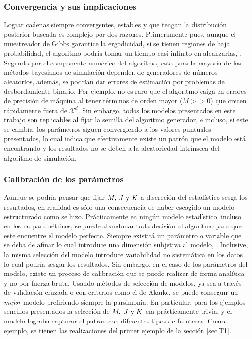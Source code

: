 \documentclass[../Main/Main.tex]{subfiles}
\begin{document}
\subsubsection*{Convergencia y sus implicaciones}
Lograr cadenas siempre convergentes, estables y que tengan la distribución posterior buscada es complejo por dos razones. Primeramente pues, aunque el muestreador de Gibbs garantice la ergodicidad, si se tienen regiones de baja probabilidad, el algoritmo podría tomar un tiempo casi infinito en alcanzarlas, \citet{robert2004monte}. Segundo por el componente numérico del algoritmo, esto pues la mayoría de los métodos bayesianos de simulación dependen de generadores de números aleatorios, además, se podrían dar errores de estimación por problemas de desbordamiento binario. Por ejemplo, no es raro que el algoritmo caiga en errores de precisión de máquina al tener términos de orden mayor ($M>>0$) que crecen rápidamente fuera de $\mathcal{X}^d$. Sin embargo, todos los modelos presentados en este trabajo son replicables al fijar la semilla del algoritmo generador, e incluso, si este se cambia, los parámetros siguen convergiendo a los valores puntuales presentados, lo cual indica que efectivamente existe un patrón que el modelo está encontrando y los resultados no se deben a la aleatoriedad intrínseca del algoritmo de simulación.

\subsubsection*{Calibración de los parámetros} 
Aunque se podría pensar que fijar $M,\;J\text{ y }K$ a discreción del estadístico sesga los resultados, en realidad es sólo una consecuencia de haber escogido un modelo estructurado como se hizo. Prácticamente en ningún modelo estadístico, incluso en los no paramétricos, se puede abandonar toda decisión al algoritmo para que este encuentre el modelo perfecto. Siempre existirá un parámetro o variable que se deba de afinar lo cual introduce una dimensión subjetiva al modelo, \citet{wasserman2007all}. Inclusive, la misma selección del modelo introduce variabilidad no sistemática en los datos lo cual podría sesgar los resultados. Sin embargo, en el caso de los parámetros del modelo, existe un proceso de calibración que se puede realizar de forma analítica y no por fuerza bruta. Usando métodos de selección de modelos, ya sea a través de validación cruzada o con criterios como el de Akaike, se puede conseguir un \textit{mejor} modelo prefiriendo siempre la parsimonia. En particular, para los ejemplos sencillos presentados la selección de $M,\;J\text{ y }K$ era prácticamente trivial y el modelo lograba capturar el patrón con diferentes tipos de fronteras. Como ejemplo, se tienen las realizaciones del primer ejemplo de la sección \ref{sec:T1}.
\end{document}

